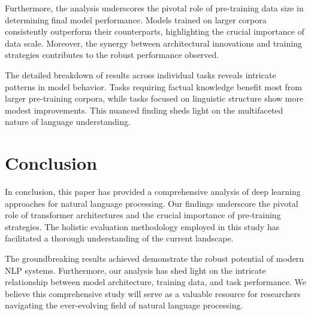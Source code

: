 \documentclass{article}
\begin{document}
Furthermore, the analysis underscores the pivotal role of pre-training data size in determining final model performance. Models trained on larger corpora consistently outperform their counterparts, highlighting the crucial importance of data scale. Moreover, the synergy between architectural innovations and training strategies contributes to the robust performance observed.

The detailed breakdown of results across individual tasks reveals intricate patterns in model behavior. Tasks requiring factual knowledge benefit most from larger pre-training corpora, while tasks focused on linguistic structure show more modest improvements. This nuanced finding sheds light on the multifaceted nature of language understanding.

\section{Conclusion}

In conclusion, this paper has provided a comprehensive analysis of deep learning approaches for natural language processing. Our findings underscore the pivotal role of transformer architectures and the crucial importance of pre-training strategies. The holistic evaluation methodology employed in this study has facilitated a thorough understanding of the current landscape.

The groundbreaking results achieved demonstrate the robust potential of modern NLP systems. Furthermore, our analysis has shed light on the intricate relationship between model architecture, training data, and task performance. We believe this comprehensive study will serve as a valuable resource for researchers navigating the ever-evolving field of natural language processing.



\end{document}

